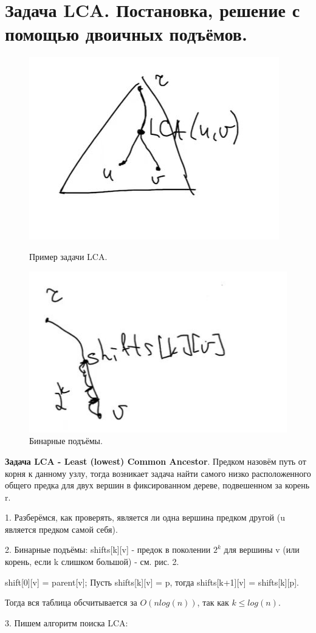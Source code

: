\setcounter{section}{95}
\section{Задача LCA. Постановка, решение с помощью двоичных подъёмов. }

\begin{figure}[!htb]
   \begin{minipage}{.5\textwidth}
     \centering
     \includegraphics[height = 2 cm]{images/96-99_lca2}
     \caption{Пример задачи LCA.}
   \end{minipage}\hfill
    \begin{minipage}{.5\textwidth}
     \centering
     \includegraphics[height = 2 cm]{images/96-99_shifts}
     \caption{Бинарные подъёмы.}
   \end{minipage}
\end{figure}

\textbf{Задача LCA - Least (lowest) Common Ancestor}. Предком назовём путь от корня к данному узлу, тогда возникает задача найти самого низко расположенного общего предка для двух вершин в фиксированном дереве, подвешенном за корень r.

1. Разберёмся, как проверять, является ли одна вершина предком другой (u является предком самой себя).



2. Бинарные подъёмы: shifts[k][v] - предок в поколении $2^k$ для вершины v (или корень, если k слишком большой) - см. рис. 2.

shift[0][v] = parent[v];
Пусть shifts[k][v] = p, тогда shifts[k+1][v] = shifts[k][p].

Тогда вся таблица обсчитывается за $O(n log(n))$, так как $k \leqslant log(n)$.

3. Пишем алгоритм поиска LCA:



